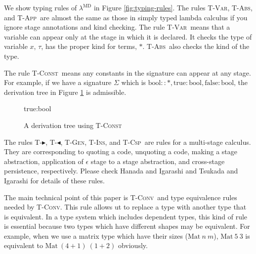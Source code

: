 \documentclass[runningheads]{llncs}
\newcommand{\LMD}{$\lambda^{\textrm{MD}}$\xspace}
\newcommand{\G}{\Gamma}
\newcommand{\V}{\vdash_\Sigma}
\newcommand{\TB}{\blacktriangleright}
\newcommand{\TBL}{\blacktriangleleft}
\newcommand{\TConst}{\textsc{T-Const}}
\newcommand{\TVar}{\textsc{T-Var}}
\newcommand{\TAbs}{\textsc{T-Abs}}
\newcommand{\TApp}{\textsc{T-App}}
\newcommand{\TConv}{\textsc{T-Conv}}
\newcommand{\TTB}{\textsc{T-$\TB$}}
\newcommand{\TTBL}{\textsc{T-$\TBL$}}
\newcommand{\TGen}{\textsc{T-Gen}}
\newcommand{\TIns}{\textsc{T-Ins}}
\newcommand{\TCsp}{\textsc{T-Csp}}
\newcommand{\ID}[1]{\infer[]{#1}{\vdots}}
\begin{document}

We show typing rules of \LMD in Figure \ref{fig:typing-rules}.
The rules \TVar , \TAbs, and \TApp\ are almost the same as those in simply typed lambda calculus 
if you ignore stage annotations and kind checking.
The rule \TVar\ means that a variable can appear only at the stage in which it is declared.
It checks the type of variable $x$, $\tau$, has the proper kind for terms, $*$.
\TAbs\ also checks the kind of the type.

The rule \TConst\ means any constants in the signature can appear at any stage.
For example, if we have a signature $\Sigma$ which is $\textrm{bool} :: *, \textrm{true}: \textrm{bool}, \textrm{false}: \textrm{bool}$,
the derivation tree in Figure \ref{fig:tconst-derivation-tree} is admissible.

\begin{figure}
	\begin{center}
		\begin{minipage}{0.50\hsize}
			\infer[\TConst]
			{\G \V \textrm{true}:\textrm{bool}@\alpha\beta}
			{\textrm{true}:\textrm{bool} \in \Sigma \andalso
				\ID{\G\V\textrm{bool}::*@\alpha\beta} \andalso
			}
			\caption{A derivation tree using \TConst}
			\label{fig:tconst-derivation-tree}
		\end{minipage}
	\end{center}
\end{figure}

The rules \TTB, \TTBL, \TGen, \TIns, and \TCsp\ are rules for a multi-stage calculus.
They are corresponding to quoting a code, unquoting a code, making a stage abstraction, 
application of $\epsilon$ stage to a stage abstraction, and cross-stage persistence, respectively.
Please check Hanada and Igarashi \cite{Hanada2014} and Tsukada and Igarashi \cite{Tsukada} for details of these rules.

The main technical point of this paper is \TConv\ and type equivalence rules needed by \TConv.
This rule allows ut to replace a type with another type that is equivalent.
In a type system which includes dependent types, this kind of rule is essential
because two types which have different shapes may be equivalent.
For example, when we use a matrix type which have their sizes ($\textrm{Mat}\ n\ m$),
$\textrm{Mat}\ 5\ 3$ is equivalent to $\textrm{Mat}\ (4+1)\ (1+2)$ obviously.
\end{document}
